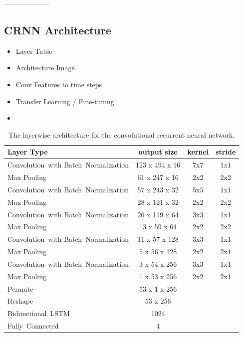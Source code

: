     --------------------

\subsection{CRNN Architecture}

    \begin{itemize}
        \item Layer Table
        \item Architecture Image
        \item Conv Features to time steps
        \item Transfer Learning / Fine-tuning
        \item 
    \end{itemize}
    
  \begin{table}[h]
  \centering
  \begin{tabularx}{\textwidth}{Xccc}
  \toprule
Layer Type                                          & output size    & kernel & stride  \\ \midrule
\mbox{Convolution with} \mbox{Batch Normalization}  & 123 x 494 x 16  & 7x7    & 1x1     \\ 
Max Pooling                                         & 61 x 247 x 16   & 2x2    & 2x2     \\ 
\mbox{Convolution with} \mbox{Batch Normalization}  & 57 x 243 x 32   & 5x5    & 1x1     \\ 
Max Pooling                                         & 28 x 121 x 32   & 2x2    & 2x2     \\ 
\mbox{Convolution with} \mbox{Batch Normalization}  & 26 x 119 x 64   & 3x3    & 1x1     \\ 
Max Pooling                                         & 13 x 59 x 64    & 2x2    & 2x2     \\ 
\mbox{Convolution with} \mbox{Batch Normalization}  & 11 x 57 x 128   & 3x3    & 1x1     \\ 
Max Pooling                                         & 5 x 56 x 128    & 2x2    & 2x1     \\ 
\mbox{Convolution with} \mbox{Batch Normalization}  & 3 x 54 x 256    & 3x3    & 1x1     \\ 
Max Pooling                                         & 1 x 53 x 256    & 2x2    & 2x1     \\ 
Permute                                             & 53 x 1 x 256    &        &         \\
Reshape                                             & 53 x 256        &        &         \\
\mbox{Bidirectional LSTM}                           & 1024            &        &         \\
\mbox{Fully Connected}                              & 4               &        &         \\
  \bottomrule
  \end{tabularx}
  \caption{The layerwise architecture for the convolutional recurrent neural network.}
  \label{tab:layers_CRNN}
  \end{table}
  
  
